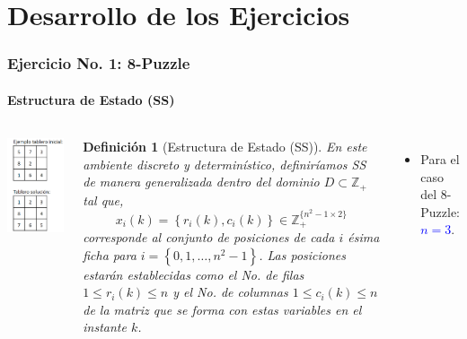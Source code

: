\documentclass[aspectratio=169]{beamer}
\newtheorem{definicion}{Definici\'on}
\begin{document}
\section{Desarrollo de los Ejercicios}
\begin{frame}
\frametitle{Ejercicio No. 1: 8-Puzzle}
\framesubtitle{Estructura de Estado (SS)}
\begin{columns}
\hspace{-.25cm}\includegraphics[scale=.55]{Figures/8-Puzzle.png}
\begin{definicion}[Estructura de Estado (SS)]
En este ambiente discreto y determinístico, definiríamos SS de manera
generalizada dentro del dominio $D\subset\mathbb{Z}_{+}$ tal que,
\begin{equation*}
x_i(k) = \left\{r_i(k),c_i(k)\right\} \in \mathbb{Z}_{+}^{\{n^2-1\times2\}}
\end{equation*}
corresponde al conjunto de posiciones de cada $i$ ésima ficha para $i=\left\{0,1,\ldots,n^2-1\right\}$. Las
posiciones estarán establecidas como el No. de filas $1\!\leq\!r_i(k)\!\leq\!n$ y el No. de
columnas $1\!\leq\!c_i(k)\!\leq\!n$ de la matriz que se forma con estas variables en el instante $k$.
\end{definicion}
\begin{itemize}
\item Para el caso del 8-Puzzle: \textcolor{blue}{$n = 3$}.
\end{itemize}
\end{columns}
\end{frame}
\end{document}
